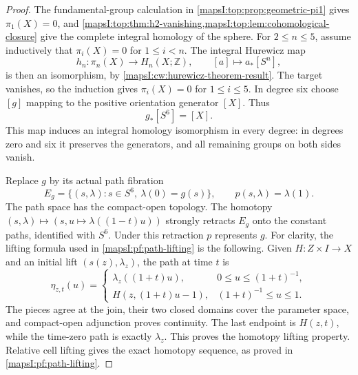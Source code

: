\begin{proof}
The fundamental-group calculation in
\cref{mapsI:top:prop:geometric-pi1} gives \(\pi_1(X)=0\), and
\cref{mapsI:top:thm:h2-vanishing,mapsI:top:lem:cohomological-closure}
give the complete integral homology of the sphere.  For \(2\le n\le5\),
assume inductively that \(\pi_i(X)=0\) for \(1\le i<n\).  The integral
Hurewicz map
\[
 h_n:\pi_n(X)\longrightarrow H_n(X;\mathbb Z),
 \qquad [a]\longmapsto a_*[S^n],
\]
is then an isomorphism, by \cref{mapsI:cw:hurewicz-theorem-result}.
The target vanishes, so the induction gives \(\pi_i(X)=0\) for
\(1\le i\le5\).  In degree six choose \([g]\) mapping to the positive
orientation generator \([X]\).  Thus
\begin{equation}
 g_*[S^6]=[X].
 \label{mapsI:course:degree-one}
\end{equation}
This map induces an integral homology isomorphism in every degree:
in degrees zero and six it preserves the generators, and all remaining
groups on both sides vanish.

Replace \(g\) by its actual path fibration
\[
 E_g=\{(s,\lambda):s\in S^6,\ \lambda(0)=g(s)\},
 \qquad p(s,\lambda)=\lambda(1).
\]
The path space has the compact-open topology.  The homotopy
\((s,\lambda)\mapsto(s,u\mapsto\lambda((1-t)u))\) strongly retracts
\(E_g\) onto the constant paths, identified with \(S^6\).
Under this retraction \(p\) represents \(g\).
For clarity, the lifting formula used in \cref{mapsI:pf:path-lifting}
is the following.  Given \(H:Z\times I\to X\) and an initial lift
\((s(z),\lambda_z)\), the path at time \(t\) is
\[
 \eta_{z,t}(u)=
 \begin{cases}
 \lambda_z((1+t)u),&0\le u\le (1+t)^{-1},\\
 H(z,(1+t)u-1),&(1+t)^{-1}\le u\le1.
 \end{cases}
\]
The pieces agree at the join, their two closed domains cover the parameter
space, and compact-open adjunction proves continuity.  The last endpoint
is \(H(z,t)\), while the time-zero path is exactly \(\lambda_z\).
This proves the homotopy lifting property.  Relative cell lifting gives
the exact homotopy sequence, as proved in
\cref{mapsI:pf:path-lifting}.


\end{proof}
